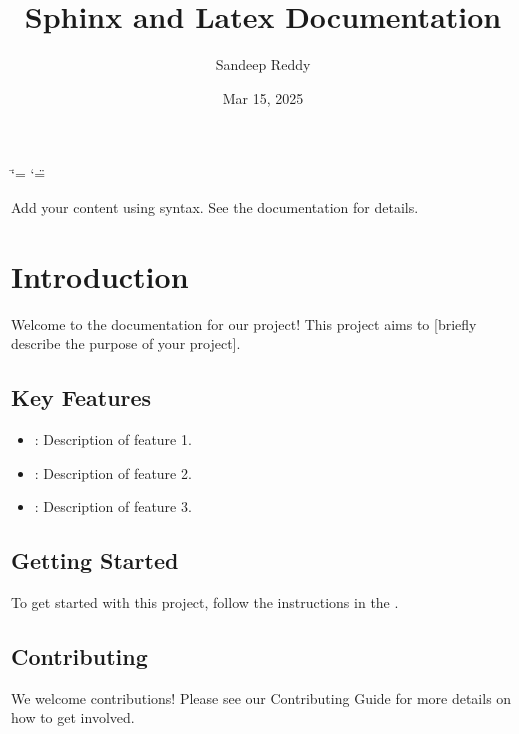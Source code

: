 \documentclass[letterpaper,10pt,english]{sphinxmanual}
\title{Sphinx and Latex Documentation}
\date{Mar 15, 2025}
\author{Sandeep Reddy}
\begin{document}
\ifdefined\shorthandoff
  \ifnum\catcode`\=\string=\active\shorthandoff{=}\fi
  \ifnum\catcode`\"=\active{}\fi
\fi

\pagestyle{empty}
\sphinxmaketitle
\pagestyle{plain}
\sphinxtableofcontents
\pagestyle{normal}
\label{\detokenize{index::doc}}


\sphinxAtStartPar
Add your content using  syntax. See the
documentation for details.

\sphinxstepscope


\chapter{Introduction}
\label{\detokenize{Introduction:introduction}}\label{\detokenize{Introduction::doc}}
\sphinxAtStartPar
Welcome to the documentation for our project! This project aims to {[}briefly describe the purpose of your project{]}.


\section{Key Features}
\label{\detokenize{Introduction:key-features}}\begin{itemize}
\item {} 
\sphinxAtStartPar
{}: Description of feature 1.

\item {} 
\sphinxAtStartPar
{}: Description of feature 2.

\item {} 
\sphinxAtStartPar
{}: Description of feature 3.

\end{itemize}


\section{Getting Started}
\label{\detokenize{Introduction:getting-started}}
\sphinxAtStartPar
To get started with this project, follow the instructions in the .


\section{Contributing}
\label{\detokenize{Introduction:contributing}}
\sphinxAtStartPar
We welcome contributions! Please see our Contributing Guide for more details on how to get involved.
\end{document}
